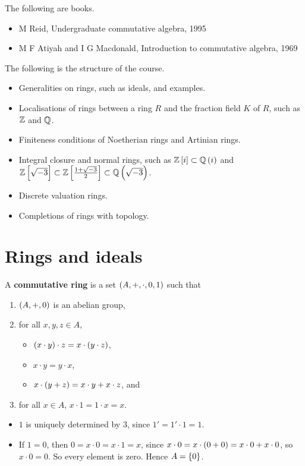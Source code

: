 The following are books.
\begin{itemize}
\item M Reid, Undergraduate commutative algebra, 1995
\item M F Atiyah and I G Macdonald, Introduction to commutative algebra, 1969
\end{itemize}

The following is the structure of the course.
\begin{itemize}
\item Generalities on rings, such as ideals, and examples.
\item Localisations of rings between a ring $ R $ and the fraction field $ K $ of $ R $, such as $ \mathbb{Z} $ and $ \mathbb{Q} $.
\item Finiteness conditions of Noetherian rings and Artinian rings.
\item Integral closure and normal rings, such as $ \ZZ\sbr{i} \subset \QQ\br{i} $ and $ \ZZ\sbr{\sqrt{-3}} \subset \ZZ\sbr{\tfrac{1 + \sqrt{-3}}{2}} \subset \QQ\br{\sqrt{-3}} $.
\item Discrete valuation rings.
\item Completions of rings with topology.
\end{itemize}

\pagebreak

\section{Rings and ideals}

\begin{definition}
A \textbf{commutative ring} is a set $ \br{A, +, \cdot, 0, 1} $ such that
\begin{enumerate}
\item $ \br{A, +, 0} $ is an abelian group,
\item for all $ x, y, z \in A $,
\begin{itemize}
\item $ \br{x \cdot y} \cdot z = x \cdot \br{y \cdot z} $,
\item $ x \cdot y = y \cdot x $,
\item $ x \cdot \br{y + z} = x \cdot y + x \cdot z $, and
\end{itemize}
\item for all $ x \in A $, $ x \cdot 1 = 1 \cdot x = x $.
\end{enumerate}
\end{definition}

\begin{remark}
\hfill
\begin{itemize}
\item $ 1 $ is uniquely determined by $ 3 $, since $ 1' = 1' \cdot 1 = 1 $.
\item If $ 1 = 0 $, then $ 0 = x \cdot 0 = x \cdot 1 = x $, since $ x \cdot 0 = x \cdot \br{0 + 0} = x \cdot 0 + x \cdot 0 $, so $ x \cdot 0 = 0 $. So every element is zero. Hence $ A = \cbr{0} $.
\end{itemize}
\end{remark}

